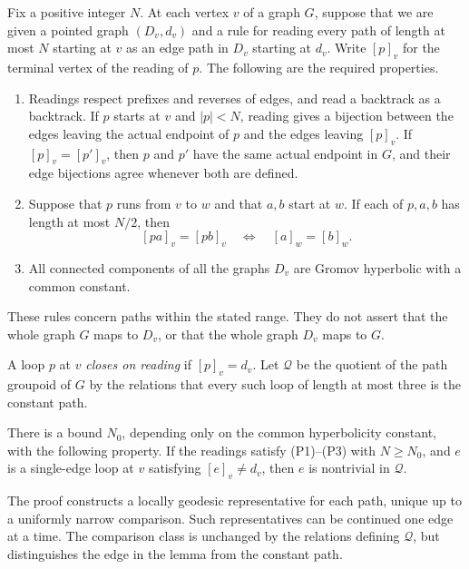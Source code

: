 Fix a positive integer $N$.  At each vertex $v$ of a graph $G$, suppose that
we are given a pointed graph $(D_v,d_v)$ and a rule for reading every path
of length at most $N$ starting at $v$ as an edge path in $D_v$ starting at
$d_v$.  Write $[p]_v$ for the terminal vertex of the reading of $p$.
The following are the required properties.
\begin{enumerate}
\item[\textnormal{(P1)}] Readings respect prefixes and reverses of edges,
and read a backtrack as a backtrack.  If $p$ starts at $v$ and $|p|<N$,
reading gives a bijection between the edges leaving the actual endpoint of
$p$ and the edges leaving $[p]_v$.  If $[p]_v=[p']_v$, then $p$ and $p'$
have the same actual endpoint in $G$, and their edge bijections agree
whenever both are defined.
\item[\textnormal{(P2)}] Suppose that $p$ runs from $v$ to $w$ and that
$a,b$ start at $w$.  If each of $p,a,b$ has length at most $N/2$, then
\begin{equation}\label{path:change-root}
 [pa]_v=[pb]_v\quad\Longleftrightarrow\quad [a]_w=[b]_w.
\end{equation}
\item[\textnormal{(P3)}] All connected components of all the graphs $D_v$
are Gromov hyperbolic with a common constant.
\end{enumerate}
These rules concern paths within the stated range.  They do not assert
that the whole graph $G$ maps to $D_v$, or that the whole graph $D_v$ maps
to $G$.

A loop $p$ at $v$ \emph{closes on reading} if $[p]_v=d_v$.  Let
$\mathcal Q$ be the quotient of the path groupoid of $G$ by the relations
that every such loop of length at most three is the constant path.

\begin{lemma}\label{thm:path-lemma}
There is a bound $N_0$, depending only on the common hyperbolicity
constant, with the following property.  If the readings satisfy
\textnormal{(P1)--(P3)} with $N\ge N_0$, and $e$ is a single-edge loop at
$v$ satisfying $[e]_v\ne d_v$, then $e$ is nontrivial in $\mathcal Q$.
\end{lemma}

The proof constructs a locally geodesic representative for each path,
unique up to a uniformly narrow comparison.  Such representatives can be
continued one edge at a time.  The comparison class is unchanged by the
relations defining $\mathcal Q$, but distinguishes the edge in the lemma
from the constant path.

